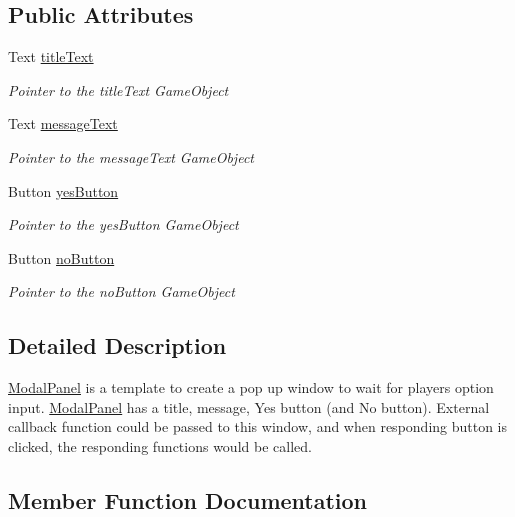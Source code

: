 \subsection*{Public Attributes}
\begin{DoxyCompactItemize}
\item 
Text \hyperlink{classdoki_unity_1_1_modal_panel_a8bb32dc36292b9da60c7125f150d759d}{title\+Text}
\begin{DoxyCompactList}\small\item\em Pointer to the title\+Text Game\+Object \end{DoxyCompactList}\item 
Text \hyperlink{classdoki_unity_1_1_modal_panel_a6c9c26430055c5e6beb1d7db2dfb6f68}{message\+Text}
\begin{DoxyCompactList}\small\item\em Pointer to the message\+Text Game\+Object \end{DoxyCompactList}\item 
Button \hyperlink{classdoki_unity_1_1_modal_panel_a72113e073c692caa38601f17c6ffde6c}{yes\+Button}
\begin{DoxyCompactList}\small\item\em Pointer to the yes\+Button Game\+Object \end{DoxyCompactList}\item 
Button \hyperlink{classdoki_unity_1_1_modal_panel_ab383aea9285e694802836034b933f1f5}{no\+Button}
\begin{DoxyCompactList}\small\item\em Pointer to the no\+Button Game\+Object \end{DoxyCompactList}\end{DoxyCompactItemize}


\subsection{Detailed Description}
\hyperlink{classdoki_unity_1_1_modal_panel}{Modal\+Panel} is a template to create a pop up window to wait for player\textquotesingle{}s option input. \hyperlink{classdoki_unity_1_1_modal_panel}{Modal\+Panel} has a title, message, Yes button (and No button). External callback function could be passed to this window, and when responding button is clicked, the responding functions would be called. 



\subsection{Member Function Documentation}
